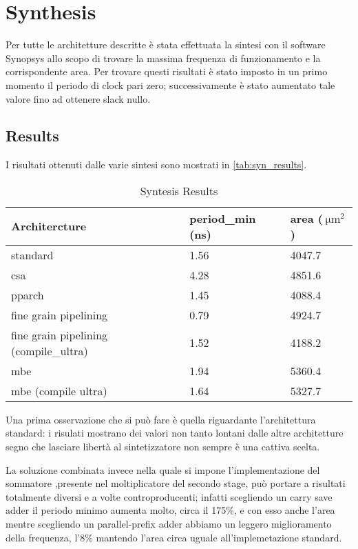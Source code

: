 \section{Synthesis}
Per tutte le architetture descritte è stata effettuata la sintesi con il software Synopsys allo scopo di trovare la massima frequenza di funzionamento e la corrispondente area. Per trovare questi risultati è stato imposto in un primo momento il periodo di clock pari zero; successivamente è stato aumentato tale valore fino ad ottenere slack nullo.

\subsection{Results}

I risultati ottenuti dalle varie sintesi sono mostrati in \autoref{tab:syn_results}.
\begin{table}[h]
\begin{center}
\begin{tabular}{|l|l|l|}
\hline
Architercture & period\_min (ns) & area ($\SI{}{\micro\meter}^2$)\\
\hline
standard & 1.56 & 4047.7\\
\hline
csa & 4.28 & 4851.6\\
\hline
pparch & 1.45 & 4088.4\\
\hline
fine grain pipelining & 0.79 & 4924.7\\
\hline
fine grain pipelining (compile\_ultra) & 1.52 & 4188.2\\
\hline
mbe & 1.94 & 5360.4\\
\hline
mbe (compile ultra) & 1.64 & 5327.7\\
\hline
\end{tabular}
\end{center}
\caption{Syntesis Results}
\label{tab:syn_results}
\end{table}
Una prima osservazione che si può fare è quella riguardante l'architettura standard: i risulati mostrano dei valori non tanto lontani dalle altre architetture segno che lasciare libertà al sintetizzatore non sempre è una cattiva scelta.

La soluzione combinata invece nella quale si impone l'implementazione del sommatore ,presente nel moltiplicatore del secondo stage, può portare a risultati totalmente diversi e a volte controproducenti; infatti scegliendo un carry save adder il periodo minimo aumenta molto, circa il 175\%, e con esso anche l'area mentre scegliendo un parallel-prefix adder abbiamo un leggero miglioramento della frequenza, l'8\% mantendo l'area circa uguale all'implemetazione standard.

